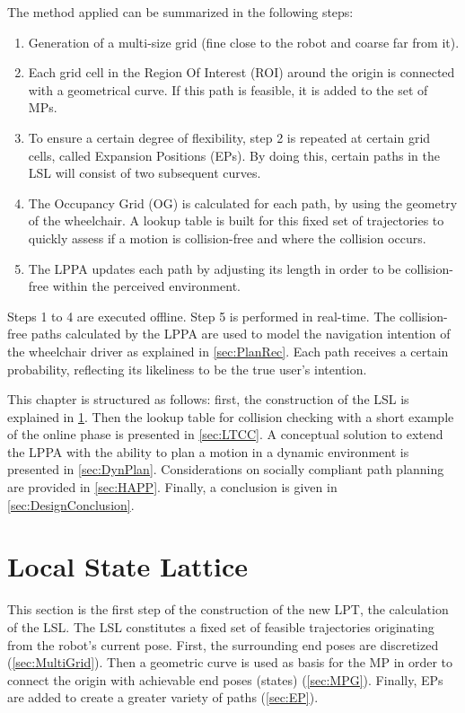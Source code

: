 The method applied can be summarized in the following steps:
\begin{enumerate}
\item Generation of a multi-size grid (fine close to the robot and coarse far from it).
\item Each grid cell in the Region Of Interest (ROI) around the origin is connected with a geometrical curve. If this path is feasible, it is added to the set of MPs.
\item To ensure a certain degree of flexibility, step 2 is repeated at certain grid cells, called Expansion Positions (EPs). By doing this, certain paths in the LSL will consist of two subsequent curves.
\item The Occupancy Grid (OG) is calculated for each path, by using the geometry of the wheelchair. A lookup table is built for this fixed set of trajectories to quickly assess if a motion is collision-free and where the collision occurs.
\item The LPPA updates each path by adjusting its length in order to be collision-free within the perceived environment.
\end{enumerate}

Steps 1 to 4 are executed offline. Step 5 is performed in real-time. The collision-free paths calculated by the LPPA are used to model the navigation intention of the wheelchair driver as explained in \cref{sec:PlanRec}. Each path receives a certain probability, reflecting its likeliness to be the true user's intention.

This chapter is structured as follows: first, the construction of the LSL is explained in \cref{sec:LSL}. Then the lookup table for collision checking with a short example of the online phase is presented in \cref{sec:LTCC}. A conceptual solution to extend the LPPA with the ability to plan a motion in a dynamic environment is presented in \cref{sec:DynPlan}. Considerations on socially compliant  path planning are provided in \cref{sec:HAPP}. Finally, a conclusion is given in \cref{sec:DesignConclusion}.

\section{Local State Lattice} \label{sec:LSL}
This section is the first step of the construction of the new LPT, the calculation of the LSL. The LSL constitutes a fixed set of feasible trajectories originating from the robot's current pose. First, the surrounding end poses are discretized (\cref{sec:MultiGrid}). Then a geometric curve is used as basis for the MP in order to connect the origin with achievable end poses (states) (\cref{sec:MPG}). Finally, EPs are added to create a greater variety of paths (\cref{sec:EP}).

